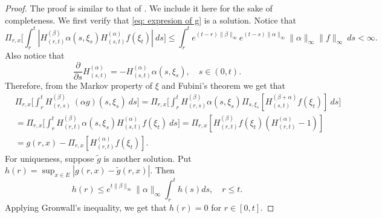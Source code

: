 \documentclass[UTF8]{pkuthss}
\theoremstyle{plain}
\theoremstyle{definition}
\numberwithin{equation}{section}
\begin{document}
\begin{proof}
    The proof is similar to that of \cite[Lemma A.1.5]{Dynkin1993Superprocesses}. We include it here for the sake of completeness.
    We first verify that \eqref{eq: expresion of g} is a solution.
    Notice that
\begin{equation}
   \Pi_{r,x} \Big[ \int_r^t | H_{(r,t)}^{(\beta)}\alpha(s,\xi_s) H_{(s,t)}^{(\alpha)} f(\xi_t)| ~ds \Big]
    \leq  \int_r^t e^{(t-r)\|\beta\|_\infty}e^{(t-s)\|\alpha\|_\infty}\|\alpha\|_\infty\|f\|_\infty ~ds
    < \infty.
\end{equation}
    Also notice that
\begin{equation}
\label{eq: crucial for Feynman-Kac}
    \frac{\partial}{\partial s} H^{(\alpha)}_{(s,t)}= -H^{(\alpha)}_{(s,t)}\alpha(s,\xi_s),
    \quad s\in (0,t).
\end{equation}
    Therefore, from the Markov property of $\xi$ and Fubini's theorem we get that
\begin{align}
    &\Pi_{r,x} \Big[ \int_r^tH_{(r,s)}^{(\beta)}~(\alpha g)(s,\xi_s)~ds \Big]
    =\Pi_{r,x} \Big[ \int_r^t H_{(r,s)}^{(\beta)}\alpha(s,\xi_s) \Pi_{s,\xi_s}[ H_{(s,t)}^{(\beta+\alpha)} f(\xi_t)]~ds \Big]
    \\&= \Pi_{r,x} \Big[ \int_r^t H_{(r,t)}^{(\beta)}\alpha(s,\xi_s) H_{(s,t)}^{(\alpha)} f(\xi_t) ~ds \Big]
    = \Pi_{r,x} [ H_{(r,t)}^{(\beta)}f(\xi_t)(H_{(r,t)}^{(\alpha)} - 1)]
    \\&= g(r,x) - \Pi_{r,x} [ H_{(r,t)}^{(\alpha)} f(\xi_t)].
\end{align}
    For uniqueness, suppose  $\tilde g$ is another solution. Put $h(r) = \sup_{x\in E}|g(r,x) - \tilde g(r,x)|$. Then
\[
   h(r) \leq e^{t\|\beta\|_\infty}\|\alpha\|_\infty \int_r^t h(s)ds,
    \quad r\le t.
\]
Applying Gronwall's inequality, we get that $h(r) =  0$ for $r\in [0,t]$.
\end{proof}
\end{document}
